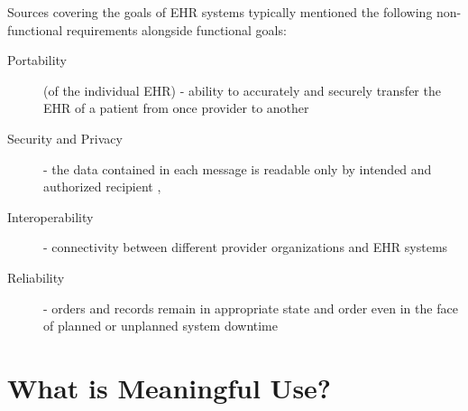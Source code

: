 \documentclass[10pt]{article}
\begin{document}



Sources covering the goals of EHR systems typically mentioned the following non-functional requirements alongside functional goals:

\begin{description}
	\item[Portability] (of the individual EHR) - ability to accurately and securely transfer the EHR of a patient from once provider to another \cite{ehrbook}
	\item[Security and Privacy] - the data contained in each message is readable only by intended and authorized recipient \cite{ehrbook}, \cite{auditingprivacy}
	\item[Interoperability] - connectivity between different provider organizations and EHR systems \cite{ehrbook}
	\item[Reliability] - orders and records remain in appropriate state and order even in the face of planned or unplanned system downtime  \cite{ehrbook}
\end{description}




\section{What is Meaningful Use?}
\label{sec:Define Meaningful Use}
\end{document}
